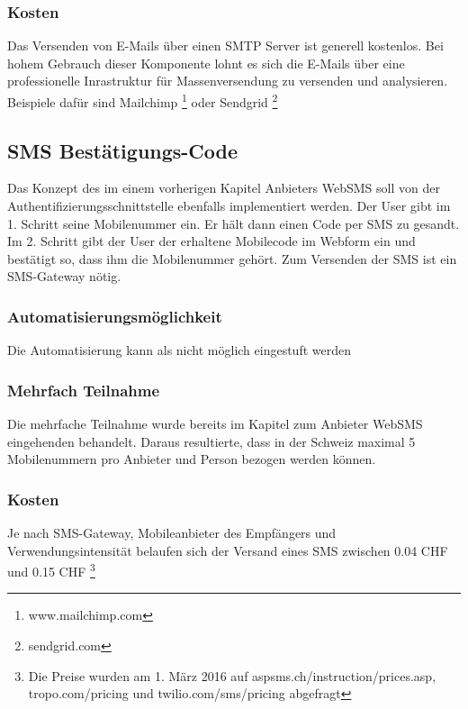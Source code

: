\subsubsection{Kosten}\label{kosten}

Das Versenden von E-Mails über einen SMTP Server ist generell kostenlos.
Bei hohem Gebrauch dieser Komponente lohnt es sich die E-Mails über eine
professionelle Inrastruktur für Massenversendung zu versenden und
analysieren. Beispiele dafür sind Mailchimp \footnote{www.mailchimp.com}
oder Sendgrid \footnote{sendgrid.com}

\subsection{SMS Bestätigungs-Code}\label{sms-bestuxe4tigungs-code}

Das Konzept des im einem vorherigen Kapitel Anbieters WebSMS soll von
der Authentifizierungsschnittstelle ebenfalls implementiert werden. Der
User gibt im 1. Schritt seine Mobilenummer ein. Er hält dann einen Code
per SMS zu gesandt. Im 2. Schritt gibt der User der erhaltene Mobilecode
im Webform ein und bestätigt so, dass ihm die Mobilenummer gehört. Zum
Versenden der SMS ist ein SMS-Gateway nötig.

\subsubsection{Automatisierungsmöglichkeit}\label{automatisierungsmuxf6glichkeit-1}

Die Automatisierung kann als nicht möglich eingestuft werden

\subsubsection{Mehrfach Teilnahme}\label{mehrfach-teilnahme-1}

Die mehrfache Teilnahme wurde bereits im Kapitel zum Anbieter WebSMS
eingehenden behandelt. Daraus resultierte, dass in der Schweiz maximal 5
Mobilenummern pro Anbieter und Person bezogen werden können.

\subsubsection{Kosten}\label{kosten-1}

Je nach SMS-Gateway, Mobileanbieter des Empfängers und
Verwendungsintensität belaufen sich der Versand eines SMS zwischen 0.04
CHF und 0.15 CHF \footnote{Die Preise wurden am 1. März 2016 auf
  aspsms.ch/instruction/prices.asp, tropo.com/pricing und
  twilio.com/sms/pricing abgefragt}


